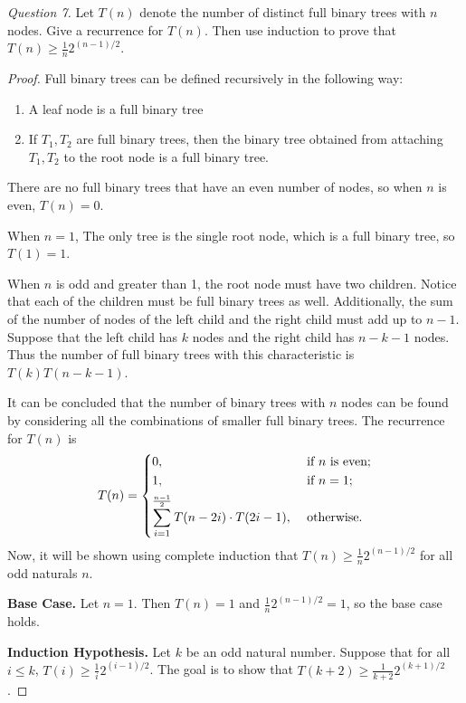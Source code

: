 \documentclass[11pt]{article}
\begin{document}
    \textit{Question 7.} Let \(T(n)\) denote the number of distinct full binary trees with \(n\) nodes. Give a recurrence for \(T(n)\). Then use induction to prove that \(T(n)\geq \frac{1}{n}2^{(n-1) / 2}\).

    \begin{proof}
        Full binary trees can be defined recursively in the following way:
        \begin{enumerate}
            \item A leaf node is a full binary tree
            \item If \(T_1,T_2\) are full binary trees, then the binary tree obtained from attaching \(T_1,T_2\) to the root node is a full binary tree.
        \end{enumerate}
        There are no full binary trees that have an even number of nodes, so when \(n\) is even, \(T(n) = 0\).

        When \(n=1\), The only tree is the single root node, which is a full binary tree, so \(T(1)=1\).

        When \(n\) is odd and greater than 1, the root node must have two children. Notice that each of the children must be full binary trees as well. Additionally, the sum of the number of nodes of the left child and the right child must add up to \(n-1\). Suppose that the left child has \(k\) nodes and the right child has \(n-k-1\) nodes. Thus the number of full binary trees with this characteristic is \(T(k)T(n-k-1)\).
        
        It can be concluded that the number of binary trees with \(n\) nodes can be found by considering all the combinations of smaller full binary trees. The recurrence for \(T(n)\) is
        \[
            T(n) = \begin{dcases}
                0, &\text{ if } n \text{ is even}  ;\\
                1, &\text{ if } n=1 ;\\
                \sum_{i=1}^{\frac{n-1}{2}} T(n-2i) \cdot T(2i - 1), &\text{ otherwise} .
            \end{dcases}
        \]
        Now, it will be shown using complete induction that \(T(n)\geq \frac{1}{n}2^{(n-1) / 2}\) for all odd naturals \(n\).

        \textbf{Base Case.} Let \(n=1\). Then \(T(n) = 1\) and \(\frac{1}{n}2^{(n-1) / 2} = 1\), so the base case holds.

        \textbf{Induction Hypothesis.} Let \(k\) be an odd natural number. Suppose that for all \(i \leq k\), \(T(i) \geq \frac{1}{i}2^{(i-1) / 2}\). The goal is to show that \(T(k+2) \geq \frac{1}{k+2}2^{(k+1) / 2}\).


\end{proof}
\end{document}
